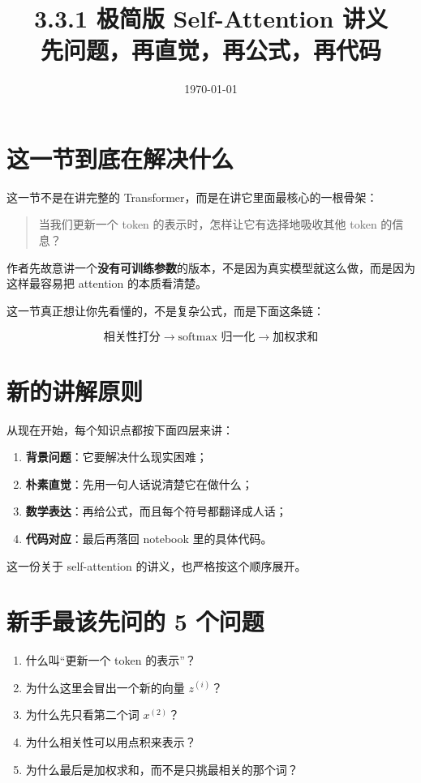 \documentclass[12pt,a4paper]{ctexart}
\title{3.3.1 极简版 Self-Attention 讲义\\\large 先问题，再直觉，再公式，再代码}
\author{}
\date{\today}
\begin{document}
\maketitle
\tableofcontents
\newpage

\section{这一节到底在解决什么}

这一节不是在讲完整的 Transformer，而是在讲它里面最核心的一根骨架：

\begin{quote}
当我们更新一个 token 的表示时，怎样让它有选择地吸收其他 token 的信息？
\end{quote}

作者先故意讲一个\textbf{没有可训练参数}的版本，不是因为真实模型就这么做，而是因为这样最容易把 attention 的本质看清楚。

这一节真正想让你先看懂的，不是复杂公式，而是下面这条链：

\[
\text{相关性打分} \rightarrow \text{softmax 归一化} \rightarrow \text{加权求和}
\]

\section{新的讲解原则}

从现在开始，每个知识点都按下面四层来讲：

\begin{enumerate}[leftmargin=2em]
  \item \textbf{背景问题}：它要解决什么现实困难；
  \item \textbf{朴素直觉}：先用一句人话说清楚它在做什么；
  \item \textbf{数学表达}：再给公式，而且每个符号都翻译成人话；
  \item \textbf{代码对应}：最后再落回 notebook 里的具体代码。
\end{enumerate}

这一份关于 self-attention 的讲义，也严格按这个顺序展开。

\section{新手最该先问的 5 个问题}

\begin{enumerate}[leftmargin=2em]
  \item 什么叫``更新一个 token 的表示''？
  \item 为什么这里会冒出一个新的向量 \(z^{(i)}\)？
  \item 为什么先只看第二个词 \(x^{(2)}\)？
  \item 为什么相关性可以用点积来表示？
  \item 为什么最后是加权求和，而不是只挑最相关的那个词？
\end{enumerate}
\end{document}
